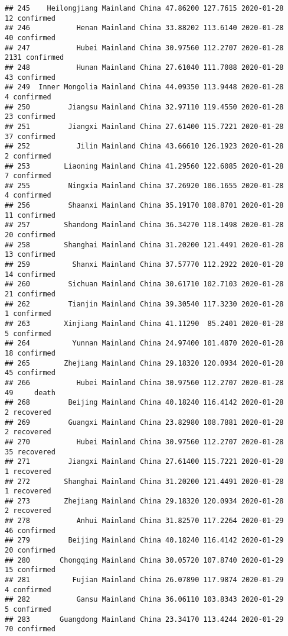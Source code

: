 \documentclass[
]{article}
\begin{document}
\begin{verbatim}
## 245    Heilongjiang Mainland China 47.86200 127.7615 2020-01-28    12 confirmed
## 246           Henan Mainland China 33.88202 113.6140 2020-01-28    40 confirmed
## 247           Hubei Mainland China 30.97560 112.2707 2020-01-28  2131 confirmed
## 248           Hunan Mainland China 27.61040 111.7088 2020-01-28    43 confirmed
## 249  Inner Mongolia Mainland China 44.09350 113.9448 2020-01-28     4 confirmed
## 250         Jiangsu Mainland China 32.97110 119.4550 2020-01-28    23 confirmed
## 251         Jiangxi Mainland China 27.61400 115.7221 2020-01-28    37 confirmed
## 252           Jilin Mainland China 43.66610 126.1923 2020-01-28     2 confirmed
## 253        Liaoning Mainland China 41.29560 122.6085 2020-01-28     7 confirmed
## 255         Ningxia Mainland China 37.26920 106.1655 2020-01-28     4 confirmed
## 256         Shaanxi Mainland China 35.19170 108.8701 2020-01-28    11 confirmed
## 257        Shandong Mainland China 36.34270 118.1498 2020-01-28    20 confirmed
## 258        Shanghai Mainland China 31.20200 121.4491 2020-01-28    13 confirmed
## 259          Shanxi Mainland China 37.57770 112.2922 2020-01-28    14 confirmed
## 260         Sichuan Mainland China 30.61710 102.7103 2020-01-28    21 confirmed
## 262         Tianjin Mainland China 39.30540 117.3230 2020-01-28     1 confirmed
## 263        Xinjiang Mainland China 41.11290  85.2401 2020-01-28     5 confirmed
## 264          Yunnan Mainland China 24.97400 101.4870 2020-01-28    18 confirmed
## 265        Zhejiang Mainland China 29.18320 120.0934 2020-01-28    45 confirmed
## 266           Hubei Mainland China 30.97560 112.2707 2020-01-28    49     death
## 268         Beijing Mainland China 40.18240 116.4142 2020-01-28     2 recovered
## 269         Guangxi Mainland China 23.82980 108.7881 2020-01-28     2 recovered
## 270           Hubei Mainland China 30.97560 112.2707 2020-01-28    35 recovered
## 271         Jiangxi Mainland China 27.61400 115.7221 2020-01-28     1 recovered
## 272        Shanghai Mainland China 31.20200 121.4491 2020-01-28     1 recovered
## 273        Zhejiang Mainland China 29.18320 120.0934 2020-01-28     2 recovered
## 278           Anhui Mainland China 31.82570 117.2264 2020-01-29    46 confirmed
## 279         Beijing Mainland China 40.18240 116.4142 2020-01-29    20 confirmed
## 280       Chongqing Mainland China 30.05720 107.8740 2020-01-29    15 confirmed
## 281          Fujian Mainland China 26.07890 117.9874 2020-01-29     4 confirmed
## 282           Gansu Mainland China 36.06110 103.8343 2020-01-29     5 confirmed
## 283       Guangdong Mainland China 23.34170 113.4244 2020-01-29    70 confirmed

\end{verbatim}
\end{document}

